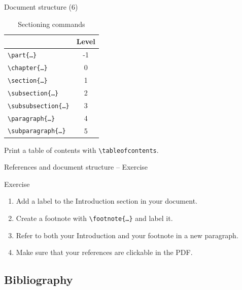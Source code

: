 \documentclass{beamer}
\newcommand{\switch}[1]{\texttt{\textbackslash#1}}
\newcommand{\command}[2]{\texttt{\textbackslash#1\{#2\}}}
\begin{document}
\begin{frame}{Document structure (6)}

\begin{table}[!h]
    \centering
    \begin{tabular}{>{\ttfamily}lc}
        \toprule
        {\normalfont\bfseries Command}  & \textbf{Level} \\
        \midrule
        \command{part}{\ldots}          & -1             \\
        \command{chapter}{\ldots}       & 0              \\
        \command{section}{\ldots}       & 1              \\
        \command{subsection}{\ldots}    & 2              \\
        \command{subsubsection}{\ldots} & 3              \\
        \command{paragraph}{\ldots}     & 4              \\
        \command{subparagraph}{\ldots}  & 5              \\
        \bottomrule
    \end{tabular}
    \caption{Sectioning commands}\label{tblsectioning}
\end{table}

Print a table of contents with \switch{tableofcontents}.

\end{frame}

\begin{frame}{References and document structure -- Exercise}
    \begin{block}{Exercise}
        \begin{enumerate}
            \item Add a label to the Introduction section in your document.
            \item Create a footnote with \command{footnote}{\ldots} and label it.
            \item Refer to both your Introduction and your footnote in a new paragraph.
            \item Make sure that your references are clickable in the PDF.
        \end{enumerate}
    \end{block}
\end{frame}

\subsection{Bibliography}
\end{document}
